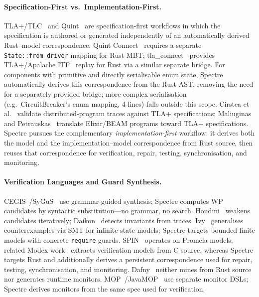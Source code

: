 \documentclass[runningheads]{llncs}
\begin{document}
\paragraph{Specification-First vs.\ Implementation-First.}
TLA+/TLC~\cite{lamport2002specifying,kuppe2019tla} and Quint~\cite{quint2023}
are specification-first workflows in which the specification is authored or
generated independently of an automatically derived Rust--model correspondence.
Quint Connect~\cite{quintconnect} requires a separate
\texttt{State::from\_driver} mapping for Rust MBT;
tla\_connect~\cite{tlaconnect} provides TLA+/Apalache ITF~\cite{apalache-itf}
replay for Rust via a similar separate bridge.
For components with primitive and directly serialisable enum state,
Spectre automatically derives this correspondence from the Rust AST, removing
the need for a separately provided bridge; more complex serialisation
(e.g.\ CircuitBreaker's enum mapping, 4 lines) falls outside this scope.
Cirstea et al.~\cite{cirstea2024validating} validate distributed-program
traces against TLA+ specifications; Maliuginas and
Petrauskas~\cite{maliuginas2024elixir} translate Elixir/BEAM programs
toward TLA+ specifications.
Spectre pursues the complementary \emph{implementation-first} workflow:
it derives both the model and the implementation--model correspondence
from Rust source, then reuses that correspondence for verification, repair,
testing, synchronisation, and monitoring.

\paragraph{Verification Languages and Guard Synthesis.}
CEGIS~\cite{solar2008program}/SyGuS~\cite{alur2013syntax} use grammar-guided
synthesis; Spectre computes WP candidates by syntactic substitution---no
grammar, no search.
Houdini~\cite{flanagan2001houdini} weakens candidates iteratively;
Daikon~\cite{ernst2007daikon} detects invariants from traces.
Ivy~\cite{padon2016ivy} generalises counterexamples via SMT for infinite-state
models; Spectre targets bounded finite models with concrete \texttt{require}
guards.
SPIN~\cite{holzmann2003spin} operates on Promela models; related Modex work~\cite{holzmann2001modex}
extracts verification models from C source, whereas Spectre targets Rust and
additionally derives a persistent correspondence used for repair, testing,
synchronisation, and monitoring.  Dafny~\cite{leino2010dafny} neither mines
from Rust source nor generates runtime monitors.
MOP~\cite{chen2007mop}/JavaMOP~\cite{jin2012javamop} use separate monitor
DSLs; Spectre derives monitors from the same spec used for verification.
\end{document}
